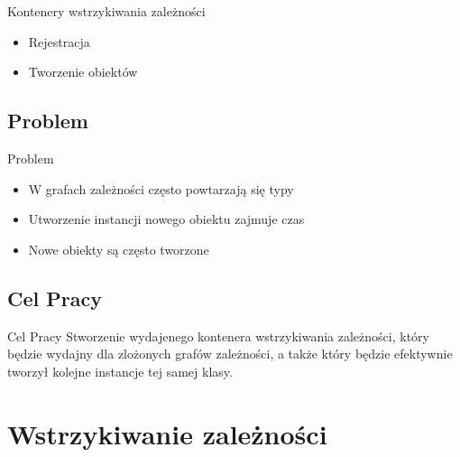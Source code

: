 \documentclass{beamer}
\begin{document}
\begin{frame}{Kontenery wstrzykiwania zależności}
\begin{itemize}
	\item Rejestracja
	\item Tworzenie obiektów
\end{itemize}
\end{frame}

\subsection*{Problem}

\begin{frame}{Problem}
  \begin{itemize}
  \item
  	W grafach zależności często powtarzają się typy
  \item
  	Utworzenie instancji nowego obiektu zajmuje czas
  \item
  	Nowe obiekty są często tworzone
  \end{itemize}
\end{frame}

\subsection*{Cel Pracy}

\begin{frame}{Cel Pracy}
Stworzenie wydajenego kontenera wstrzykiwania zależności, który będzie wydajny dla zlożonych grafów zależności, a także który będzie efektywnie tworzył kolejne instancje tej samej klasy.
\end{frame}


\section{Wstrzykiwanie zależności}
\end{document}
